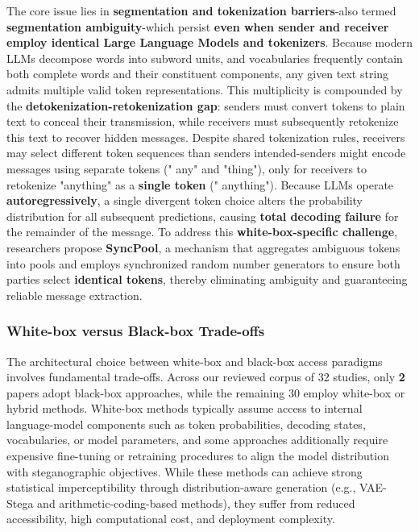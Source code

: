The core issue lies in \textbf{segmentation and tokenization barriers}-also termed \textbf{segmentation ambiguity}-which persist \textbf{even when sender and receiver employ identical Large Language Models and tokenizers}. Because modern LLMs decompose words into subword units, and vocabularies frequently contain both complete words and their constituent components, any given text string admits multiple valid token representations. This multiplicity is compounded by the \textbf{detokenization-retokenization gap}: senders must convert tokens to plain text to conceal their transmission, while receivers must subsequently retokenize this text to recover hidden messages. Despite shared tokenization rules, receivers may select different token sequences than senders intended-senders might encode messages using separate tokens (" any" and "thing"), only for receivers to retokenize "anything" as a \textbf{single token} (" anything"). Because LLMs operate \textbf{autoregressively}, a single divergent token choice alters the probability distribution for all subsequent predictions, causing \textbf{total decoding failure} for the remainder of the message. To address this \textbf{white-box-specific challenge}, researchers propose \textbf{SyncPool}, a mechanism that aggregates ambiguous tokens into pools and employs synchronized random number generators to ensure both parties select \textbf{identical tokens}, thereby eliminating ambiguity and guaranteeing reliable message extraction. \cite{qi2024provably}

\subsubsection{White-box versus Black-box Trade-offs}

The architectural choice between white-box and black-box access paradigms involves fundamental trade-offs. Across our reviewed corpus of 32 studies, only \textbf{2} papers adopt black-box approaches, while the remaining 30 employ white-box or hybrid methods. White-box methods typically assume access to internal language-model components such as token probabilities, decoding states, vocabularies, or model parameters, and some approaches additionally require expensive fine-tuning or retraining procedures to align the model distribution with steganographic objectives. While these methods can achieve strong statistical imperceptibility through distribution-aware generation (e.g., VAE-Stega and arithmetic-coding-based methods), they suffer from reduced accessibility, high computational cost, and deployment complexity.

